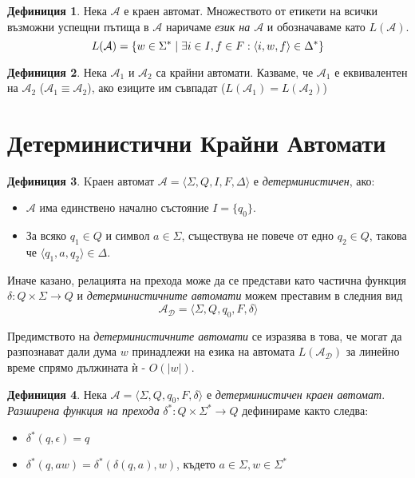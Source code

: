 \documentclass[11pt, oneside]{article}   	%
\theoremstyle{definition}
\newtheorem{definition}{Дефиниция}[section]
\begin{document}
\begin{definition} 
	Нека \( \mathcal{A} \) е краен автомат. Множеството от етикети на всички възможни успещни пътища в \( \mathcal{A} \) наричаме \emph{език на \( \mathcal{A} \)} и обозначаваме като \( L(\mathcal{A}) \). \[ L(\mathcal{A}) = \{ w \in \Sigma^* \hspace{0.1cm} | \hspace{0.1cm} \exists i \in I, f \in F : \langle i, w, f \rangle \in \Delta^* \} \]
\end{definition}

\begin{definition} 
	Нека \( \mathcal{A}_1 \) и \( \mathcal{A}_2 \) са крайни автомати. Казваме, че \( \mathcal{A}_1 \) е еквивалентен на \( \mathcal{A}_2 \) (\( \mathcal{A}_1 \equiv \mathcal{A}_2 \)), ако езиците им съвпадат (\( L(\mathcal{A}_1) = L(\mathcal{A}_2) \))
\end{definition}

\section{Детерминистични Крайни Автомати}

\begin{definition}
	Kраен автомат \( \mathcal{A} = \langle \Sigma, Q, I, F, \Delta \rangle \) е \emph{детерминистичен}, ако:

	\begin{itemize}
		\item \( \mathcal{A} \) има единствено начално състояние \(I = \{q_0\}\).
		\item За всяко \( q_1 \in Q \) и символ \( a \in \Sigma \), съществува не повече от едно \( q_2 \in Q \), такова че \( \langle q_1, a, q_2 \rangle \in \Delta \).
	\end{itemize} 

	\noindent Иначе казано, релацията на прехода може да се представи като частична функция \( \delta: Q \times \Sigma \to Q \) и \emph{детерминистичните автомати} можем преставим в следния вид \[ \mathcal{A_D} = \langle \Sigma, Q, q_0, F, \delta \rangle \]

	Предимството на \emph{детерминистичните автомати} се изразява в това, че могат да разпознават дали дума \( w \) принадлежи на езика на автомата \( L(\mathcal{A_D}) \) за линейно време спрямо дължината ѝ - \( O(|w|) \).
\end{definition}

\begin{definition}
	Нека \( \mathcal{A} = \langle \Sigma, Q, q_0, F, \delta \rangle \) е \emph{детерминистичен краен автомат}. \emph{Разширена функция на прехода} \( \delta^*: Q \times \Sigma^* \to Q \) дефинираме както следва:

	\begin{itemize}
		\item \( \delta^*(q, \epsilon) = q \)
		\item \( \delta^*(q, aw) = \delta^*(\delta(q, a), w) \), където \( a \in \Sigma, w \in \Sigma^* \)
	\end{itemize}
\end{definition}
\end{document}
